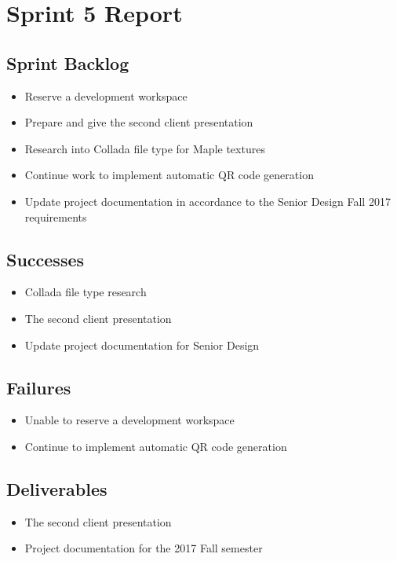 
\section{Sprint 5 Report}
\label{sec:Sprint5_report}
    \subsection{Sprint Backlog}
    \label{sec:Sprint5_backlog}
        \begin{itemize}
            \item Reserve a development workspace
            \item Prepare and give the second client presentation            
            \item Research into Collada file type for Maple textures
            \item Continue work to implement automatic QR code generation
            \item Update project documentation in accordance to the Senior Design Fall 2017 requirements
        \end{itemize}

    \subsection{Successes}
    \label{sec:Sprint5_successes}
        \begin{itemize}
            \item Collada file type research
            \item The second client presentation
            \item Update project documentation for Senior Design
        \end{itemize}

    \subsection{Failures}
    \label{sec:Sprint5_failures}
        \begin{itemize}
            \item Unable to reserve a development workspace
            \item Continue to implement automatic QR code generation
        \end{itemize}

    \subsection{Deliverables}
    \label{sec:Sprint5_deliverables}
        \begin{itemize}
            \item The second client presentation
            \item Project documentation for the 2017 Fall semester
        \end{itemize}

